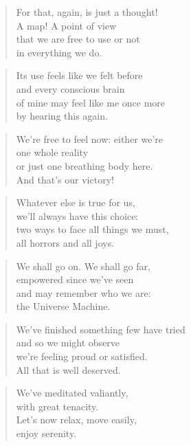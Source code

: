 \documentclass[10pt,a4paper]{article}
\begin{document}
\begin{multicols}{2}
\begin{verse}
For that, again, is just a thought!\\
A map! A point of view\\
that we are free to use or not\\
in everything we do.
\end{verse}

\begin{verse}
Its use feels like we felt before\\
and every conscious brain\\
of mine may feel like me once more\\
by hearing this again.
\end{verse}

\begin{verse}
We’re free to feel now: either we’re\\
one whole reality\\
or just one breathing body here.\\
And that’s our victory!
\end{verse}

\begin{verse}
Whatever else is true for us,\\
we’ll always have this choice:\\
two ways to face all things we must,\\
all horrors and all joys.
\end{verse}

\begin{verse}
We shall go on. We shall go far,\\
empowered since we’ve seen\\
and may remember who we are:\\
the Universe Machine.
\end{verse}

\begin{verse}
We’ve finished something few have tried\\
and so we might observe\\
we’re feeling proud or satisfied.\\
All that is well deserved.
\end{verse}

\begin{verse}
We’ve meditated valiantly,\\
with great tenacity.\\
Let’s now relax, move easily,\\
enjoy serenity.
\end{verse}


\end{multicols}
\end{document}

